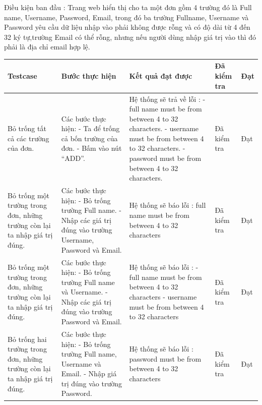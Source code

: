 \documentclass{article}
\begin{document}
Điều kiện ban đầu : Trang web hiển thị cho ta một đơn gồm 4 trường đó là Full name, Username, Password, Email, trong đó ba trường Fullname, Username và Password yêu cầu dữ liệu nhập vào phải không được rỗng và có độ dài từ 4 đến 32 ký tự,trường Email có thể rỗng, nhưng nếu người dùng nhập giá trị vào thì đó phải là địa chỉ email hợp lệ.\newline
\begin{longtable}{ | p{} |p{} | p{}  | p{}  | p{}  | } 
\hline
\textbf{Testcase}& \textbf{Bước thực hiện}& \textbf{Kết quả đạt được} & \textbf{Đã kiểm tra}& \textbf{Đạt} \\ 
\hline
\hline
Bỏ trống tất cả các trường của đơn. &
Các bước thực hiện: \newline
- Ta để trống cả bốn trường của đơn. \newline
- Bấm vào nút “ADD”. 
&
Hệ thống sẽ trả về lỗi : \newline
- full name must be from between 4 to 32 characters. \newline
- username must be from between 4 to 32 characters. \newline
- password must be from between 4 to 32 characters.
&
Đã kiểm tra &
Đạt \\

\hline
Bỏ trống một trường trong đơn, những trường còn lại ta nhập giá trị đúng. &
Các bước thực hiện: \newline
- Bỏ trống trường Full name.  \newline
- Nhập các giá trị đúng vào trường Username, Password và Email. 
&
Hệ thống sẽ báo lỗi : full name must be from between 4 to 32 characters
&
Đã kiểm tra &
Đạt \\

\hline
Bỏ trống một trường trong đơn, những trường còn lại ta nhập giá trị đúng. &
Các bước thực hiện: \newline
- Bỏ trống trường Full name và Username. \newline
- Nhập các giá trị đúng vào trường Password và Email. 
&
Hệ thống sẽ báo lỗi : \newline
- full name must be from between 4 to 32 characters \newline
- username must be from between 4 to 32 characters
&
Đã kiểm tra &
Đạt \\

\hline
Bỏ trống hai trường trong đơn, những trường còn lại ta nhập giá trị đúng. &
Các bước thực hiện: \newline
- Bỏ trống trường Full name, Username  và Email.  \newline
- Nhập giá trị đúng vào trường Password.
&
Hệ thống sẽ báo lỗi : password must be from between 4 to 32 characters
&
Đã kiểm tra &
Đạt \\


\end{longtable}
\end{document}
